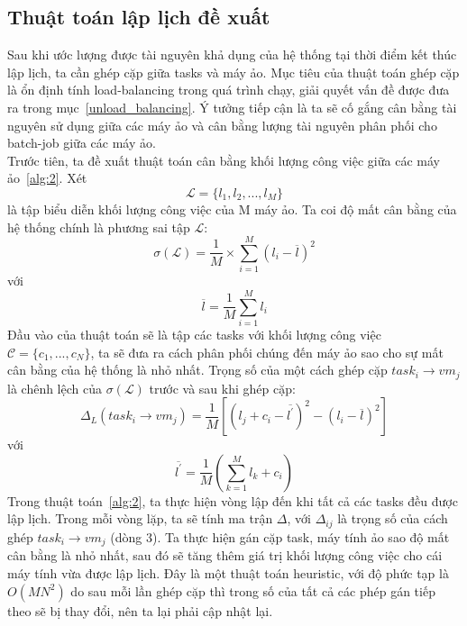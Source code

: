 \documentclass{my_style}
\begin{document}
\subsection{Thuật toán lập lịch đề xuất}
\label{proposed_algo}
Sau khi ước lượng được tài nguyên khả dụng của hệ thống tại thời điểm kết thúc lập lịch, ta cần ghép cặp giữa tasks và máy ảo. Mục tiêu của thuật toán ghép cặp là ổn định tính load-balancing trong quá trình chạy, giải quyết vấn đề được đưa ra trong mục~\ref{unload_balancing}. Ý tưởng tiếp cận là ta sẽ cố gắng cân bằng tài nguyên sử dụng giữa các máy ảo và cân bằng lượng tài nguyên phân phối cho batch-job giữa các máy ảo.\\
Trước tiên, ta đề xuất thuật toán cân bằng khối lượng công việc giữa các máy ảo~\ref{alg:2}. Xét 
\begin{equation}
	\mathcal{L} = \{l_{1}, l_{2}, ..., l_{M}\}
\end{equation}
là tập biểu diễn khối lượng công việc của M máy ảo. Ta coi độ mất cân bằng của hệ thống chính là phương sai tập $\mathcal{L}$: 
\begin{equation}
	\sigma(\mathcal{L}) = \frac{1}{M} \times \sum_{i = 1}^{M}(l_{i} - \overline{l})^{2}
\end{equation}
với 
\[
	\overline{l} = \frac{1}{M}\sum_{i = 1}^{M}l_{i}
\]
Đầu vào của thuật toán sẽ là tập các tasks với khối lượng công việc $\mathcal{C} = \{c_{1}, ..., c_{N}\}$, ta sẽ đưa ra cách phân phối chúng đến máy ảo sao cho sự mất cân bằng của hệ thống là nhỏ nhất. Trọng số của một cách ghép cặp $task_{i} \rightarrow vm_{j}$ là chênh lệch của $\sigma(\mathcal{L})$ trước và sau khi ghép cặp: 
\begin{equation}
	\Delta_{L}(task_{i} \rightarrow vm_{j}) = \frac{1}{M}[(l_{j} + c_{i} - \overline{l^{'}})^{2} - (l_{i} - \overline{l})^{2}]
\end{equation}
với 
\[
	\overline{l^{'}} = \frac{1}{M}(\sum_{k = 1}^{M}l_{k} + c_{i})
\]
Trong thuật toán~\ref{alg:2}, ta thực hiện vòng lập đến khi tất cả các tasks đều được lập lịch. Trong mỗi vòng lặp, ta sẽ tính ma trận $\Delta$, với $\Delta_{ij}$ là trọng số của cách ghép $task_{i} \rightarrow vm_{j}$ (dòng 3). Ta thực hiện gán cặp task, máy tính ảo sao độ mất cân bằng là nhỏ nhất, sau đó sẽ tăng thêm giá trị khối lượng công việc cho cái máy tính vừa được lập lịch. Đây là một thuật toán heuristic, với độ phức tạp là $O(MN^{2})$ do sau mỗi lần ghép cặp thì trong số của tất cả các phép gán tiếp theo sẽ bị thay đổi, nên ta lại phải cập nhật lại. \\
\end{document}
